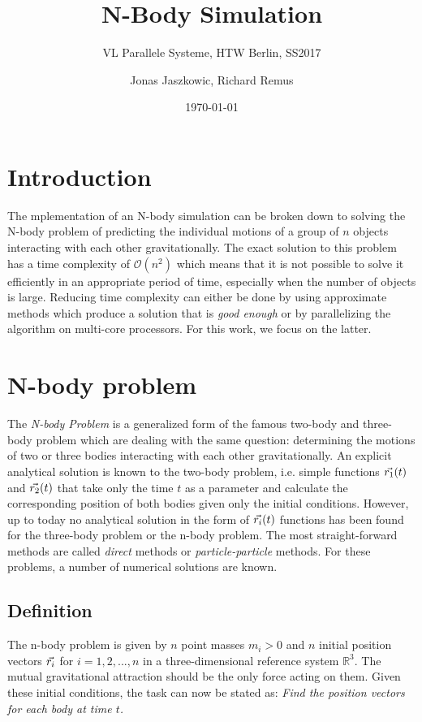 \documentclass[a4paper,11pt]{scrartcl} %
\title{N-Body Simulation}
\subtitle{VL Parallele Systeme, HTW Berlin, SS2017}
\author{Jonas Jaszkowic, Richard Remus}
\date{\today}
\newcommand*{\vv}[1]{\vec{\mkern0mu#1}}
\begin{document}
\maketitle
\tableofcontents

\section{Introduction}
The mplementation of an N-body simulation can be broken down to solving the N-body problem of predicting the individual motions of a group of $n$ objects interacting with each other gravitationally. The exact solution to this problem has a time complexity of $\mathcal{O}(n^2)$ which means that it is not possible to solve it efficiently in an appropriate period of time, especially when the number of objects is large. Reducing time complexity can either be done by using approximate methods which produce a solution that is \emph{good enough} or by parallelizing the algorithm on multi-core processors. For this work, we focus on the latter.

\section{N-body problem}
The \emph{N-body Problem} is a generalized form of the famous two-body and three-body problem which are dealing with the same question: determining the motions of two or three bodies interacting with each other gravitationally. An explicit analytical solution is known to the two-body problem, i.e. simple functions $\vv{r_1}(t)$ and $\vv{r_2}(t)$ that take only the time $t$ as a parameter and calculate the corresponding position of both bodies given only the initial conditions. However, up to today no analytical solution in the form of $\vv{r_i}(t)$ functions has been found for the three-body problem or the n-body problem. \cite{nbodysolve} The most straight-forward methods are called \textit{direct} methods or \textit{particle-particle} methods. For these problems, a number of numerical solutions are known.
\subsection{Definition}
The n-body problem is given by $n$ point masses $m_i > 0$ and $n$ initial position vectors $\vv{r_i}$ for $i=1,2,...,n$ in a three-dimensional reference system $\mathbb{R}^3$. The mutual gravitational attraction should be the only force acting on them. \cite{meyer2008introduction} Given these initial conditions, the task can now be stated as: \textit{Find the position vectors for each body at time $t$.}
\end{document}
